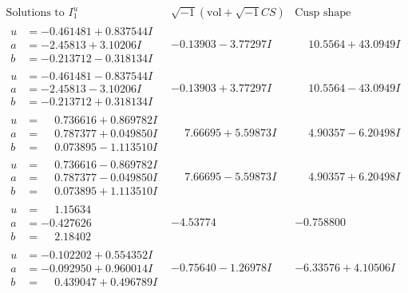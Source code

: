 \documentclass[1p]{elsarticle_modified}
\theoremstyle{definition}
\newcommand{\I}{\sqrt{-1}}
\begin{document}
$$\begin{array}{c|c|c}  
\text{Solutions to }I^u_{1}& \I (\text{vol} + \sqrt{-1}CS) & \text{Cusp shape}\\
 \hline 
\begin{aligned}
u &= -0.461481 + 0.837544 I \\
a &= -2.45813 + 3.10206 I \\
b &= -0.213712 - 0.318134 I\end{aligned}
 & -0.13903 - 3.77297 I & \phantom{-}10.5564 + 43.0949 I \\ \hline\begin{aligned}
u &= -0.461481 - 0.837544 I \\
a &= -2.45813 - 3.10206 I \\
b &= -0.213712 + 0.318134 I\end{aligned}
 & -0.13903 + 3.77297 I & \phantom{-}10.5564 - 43.0949 I \\ \hline\begin{aligned}
u &= \phantom{-}0.736616 + 0.869782 I \\
a &= \phantom{-}0.787377 + 0.049850 I \\
b &= \phantom{-}0.073895 - 1.113510 I\end{aligned}
 & \phantom{-}7.66695 + 5.59873 I & \phantom{-}4.90357 - 6.20498 I \\ \hline\begin{aligned}
u &= \phantom{-}0.736616 - 0.869782 I \\
a &= \phantom{-}0.787377 - 0.049850 I \\
b &= \phantom{-}0.073895 + 1.113510 I\end{aligned}
 & \phantom{-}7.66695 - 5.59873 I & \phantom{-}4.90357 + 6.20498 I \\ \hline\begin{aligned}
u &= \phantom{-}1.15634\phantom{ +0.000000I} \\
a &= -0.427626\phantom{ +0.000000I} \\
b &= \phantom{-}2.18402\phantom{ +0.000000I}\end{aligned}
 & -4.53774\phantom{ +0.000000I} & -0.758800\phantom{ +0.000000I} \\ \hline\begin{aligned}
u &= -0.102202 + 0.554352 I \\
a &= -0.092950 + 0.960014 I \\
b &= \phantom{-}0.439047 + 0.496789 I\end{aligned}
 & -0.75640 - 1.26978 I & -6.33576 + 4.10506 I \\ \hline\begin{aligned}

\end{aligned}
\end{array}$$
\end{document}
